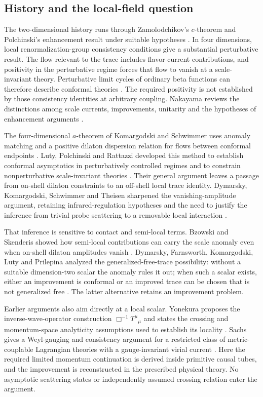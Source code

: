 \subsection{History and the local-field question}

The two-dimensional history runs through Zamolodchikov's $c$-theorem
and Polchinski's enhancement result under suitable hypotheses
\cite{Zamolodchikov1986,Polchinski1988}. In four dimensions, local
renormalization-group consistency conditions give a substantial
perturbative result. The flow relevant to the trace includes
flavor-current contributions, and positivity in the perturbative regime
forces that flow to vanish at a scale-invariant theory. Perturbative
limit cycles of ordinary beta functions can therefore describe conformal
theories \cite{FortinGrinsteinStergiou2013,JackOsborn2014}.
The required positivity is not established by those consistency
identities at arbitrary coupling. Nakayama reviews the distinctions
among scale currents, improvements, unitarity and the hypotheses of
enhancement arguments \cite{Nakayama2015}.

The four-dimensional $a$-theorem of Komargodski and Schwimmer uses
anomaly matching and a positive dilaton dispersion relation for flows
between conformal endpoints \cite{KomargodskiSchwimmer2011}.
Luty, Polchinski and Rattazzi developed this method to establish
conformal asymptotics in perturbatively controlled regimes and to
constrain nonperturbative scale-invariant theories
\cite{LutyPolchinskiRattazzi2013}. Their general argument leaves a
passage from on-shell dilaton constraints to an off-shell local trace
identity. Dymarsky, Komargodski, Schwimmer and Theisen sharpened the
vanishing-amplitude argument, retaining infrared-regulation hypotheses
and the need to justify the inference from trivial probe scattering to
a removable local interaction \cite{DKST2015}.

That inference is sensitive to contact and semi-local terms.
Bzowski and Skenderis showed how semi-local contributions can carry
the scale anomaly even when on-shell dilaton amplitudes vanish
\cite{BzowskiSkenderis2014}. Dymarsky, Farnsworth, Komargodski, Luty
and Prilepina analyzed the generalized-free-trace possibility:
without a suitable dimension-two scalar the anomaly rules it out;
when such a scalar exists, either an improvement is conformal or an
improved trace can be chosen that is not generalized free
\cite{DFKLP2016}. The latter alternative retains an improvement
problem.

Earlier arguments also aim directly at a local scalar.
Yonekura proposes the inverse-wave-operator construction
$\Box^{-1}T^\mu{}_\mu$ and states the crossing and momentum-space
analyticity assumptions used to establish its locality
\cite{Yonekura2014}. Sachs gives a Weyl-gauging and consistency
argument for a restricted class of metric-couplable Lagrangian theories
with a gauge-invariant virial current \cite{Sachs2015}.
Here the required limited momentum continuation is derived inside
primitive causal tubes, and the improvement is reconstructed in the
prescribed physical theory. No asymptotic scattering states or
independently assumed crossing relation enter the argument.

